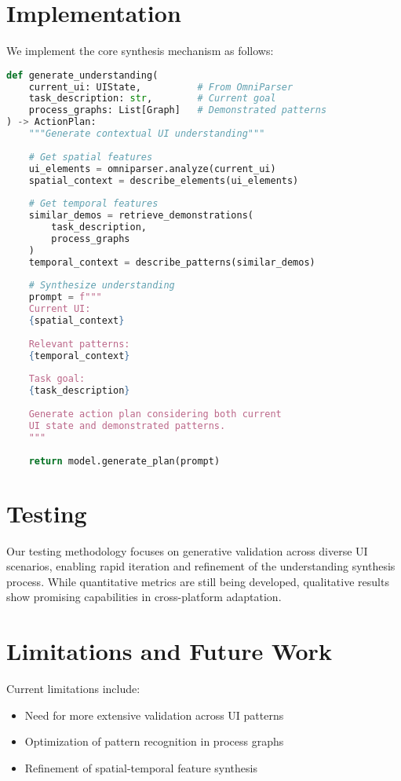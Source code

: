 \documentclass{article}
\begin{document}
\section{Implementation}
We implement the core synthesis mechanism as follows:

\begin{lstlisting}[language=Python]
def generate_understanding(
    current_ui: UIState,          # From OmniParser
    task_description: str,        # Current goal
    process_graphs: List[Graph]   # Demonstrated patterns
) -> ActionPlan:
    """Generate contextual UI understanding"""
    
    # Get spatial features
    ui_elements = omniparser.analyze(current_ui)
    spatial_context = describe_elements(ui_elements)
    
    # Get temporal features
    similar_demos = retrieve_demonstrations(
        task_description, 
        process_graphs
    )
    temporal_context = describe_patterns(similar_demos)
    
    # Synthesize understanding
    prompt = f"""
    Current UI:
    {spatial_context}
    
    Relevant patterns:
    {temporal_context}
    
    Task goal:
    {task_description}
    
    Generate action plan considering both current
    UI state and demonstrated patterns.
    """
    
    return model.generate_plan(prompt)
\end{lstlisting}

\section{Testing}

Our testing methodology focuses on generative validation across diverse UI scenarios, enabling rapid iteration and refinement of the understanding synthesis process. While quantitative metrics are still being developed, qualitative results show promising capabilities in cross-platform adaptation.

\section{Limitations and Future Work}

Current limitations include:
\begin{itemize}
    \item Need for more extensive validation across UI patterns
    \item Optimization of pattern recognition in process graphs
    \item Refinement of spatial-temporal feature synthesis
\end{itemize}
\end{document}
